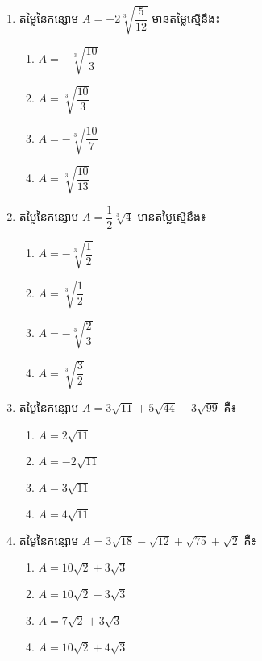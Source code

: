 \begin{enumerate}
\item តម្លៃនៃកន្សោម $A=-2\sqrt[3]{\dfrac{5}{12}}$ មានតម្លៃស្មើនឹង៖
\begin{multicols}{4}
\begin{enumerate}[label=\alph*.]
	\item $A=-\sqrt[3]{\dfrac{10}{3}}$
	\item $A=\sqrt[3]{\dfrac{10}{3}}$
	\item $A=-\sqrt[3]{\dfrac{10}{7}}$
	\item $A=\sqrt[3]{\dfrac{10}{13}}$
\end{enumerate}
\end{multicols}

\item តម្លៃនៃកន្សោម $A=\dfrac{1}{2}\sqrt[3]{4}$ មានតម្លៃស្មើនឹង៖
\begin{multicols}{4}
\begin{enumerate}[label=\alph*.]
	\item $A=-\sqrt[3]{\dfrac{1}{2}}$
	\item $A=\sqrt[3]{\dfrac{1}{2}}$
	\item $A=-\sqrt[3]{\dfrac{2}{3}}$
	\item $A=\sqrt[3]{\dfrac{3}{2}}$
\end{enumerate}
\end{multicols}

\item តម្លៃនៃកន្សោម $A=3\sqrt{11}+5\sqrt{44}-3\sqrt{99}$ គឺ៖
\begin{multicols}{4}
\begin{enumerate}[label=\alph*.]
	\item $A=2\sqrt{11}$
	\item $A=-2\sqrt{11}$
	\item $A=3\sqrt{11}$
	\item $A=4\sqrt{11}$	
\end{enumerate}
\end{multicols}

\item តម្លៃនៃកន្សោម $A=3\sqrt{18}-\sqrt{12}+\sqrt{75}+\sqrt{2}$ គឺ៖
\begin{multicols}{2}
\begin{enumerate}[label=\alph*.]
	\item $A=10\sqrt{2}+3\sqrt{3}$
	\item $A=10\sqrt{2}-3\sqrt{3}$
	\item $A=7\sqrt{2}+3\sqrt{3}$
	\item $A=10\sqrt{2}+4\sqrt{3}$
\end{enumerate}
\end{multicols}


\end{enumerate}
